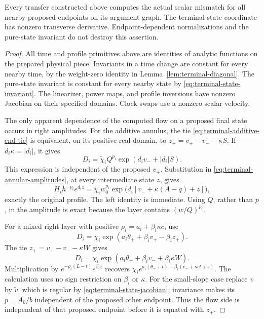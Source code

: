\begin{lemma}
\label{lem:terminal-tied-endpoints}
Every transfer constructed above computes the actual scalar mismatch for
all nearby proposed endpoints on its argument graph.  The terminal state
coordinate has nonzero transverse derivative.  Endpoint-dependent
normalizations and the pure-state invariant do not destroy this assertion.
\end{lemma}
\begin{proof}
All time and profile primitives above are identities of analytic functions
on the prepared physical piece.  Invariants in a time change are constant
for every nearby time, by the weight-zero identity in
Lemma~\ref{lem:terminal-diagonal}.  The pure-state invariant is constant
for every nearby state by \eqref{eq:terminal-state-invariant}.  The
linearizer, power maps, and profile inversions have nonzero Jacobian on
their specified domains.  Clock swaps use a nonzero scalar velocity.

The only apparent dependence of the computed flow on a proposed final
state occurs in right amplitudes.  For the additive annulus, the tie
\eqref{eq:terminal-additive-end-tie} is equivalent, on its positive real
domain, to
\(z_+=v_+-v_- -\kappa S\).  If \(d_i\kappa=|d_i|\), it gives
\begin{equation}\label{eq:terminal-cancel-additive}
 D_i=\widetilde\chi_iQ^{p_i}
       \exp(d_iv_-+|d_i|S).
\end{equation}
This expression is independent of the proposed \(v_+\).  Substitution
in \eqref{eq:terminal-annular-amplitudes}, at every intermediate state
\(z\), gives
\[
 H_i h^{-p_i}e^{d_i z}
 =\widetilde\chi_iw_0^{p_i}
       \exp\bigl(d_i[v_-+\kappa(A-q)+z]\bigr),
\]
exactly the original profile.  The left identity is immediate.  Using
\(Q\), rather than \(p\), in the amplitude is exact because the layer
contains \((w/Q)^{p_i}\).

For a mixed right layer with positive
\(\rho_i=a_i+\beta_i\kappa c\), use
\[
 D_i=\chi_i\exp(a_i\theta_++\beta_iv_+-\beta_i z_+).
\]
The tie \(z_+=v_+-v_- -\kappa W\) gives
\[
 D_i=\chi_i\exp(a_i\theta_++\beta_iv_-+\beta_i\kappa W).
\]
Multiplication by \(e^{-\rho_i(L-t)}e^{\beta_i z}\) recovers
\(\chi_i e^{a_i(\theta_-+t)+\beta_i(v_-+\kappa ct+z)}\).
The calculation uses no sign restriction on \(\beta_i\) or \(\kappa\).
For the small-slope case replace \(v\) by \(\widetilde v\), which is
regular by \eqref{eq:terminal-state-jacobian}; invariance makes its
\(p=A_0/b\) independent of the proposed other endpoint.  Thus the flow
side is independent of that proposed endpoint before it is equated with
\(z_+\).


\end{proof}
